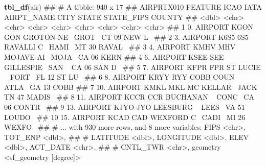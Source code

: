 \documentclass[11pt,ignorenonframetext,]{beamer}
\newenvironment{Shaded}{}{}
\newcommand{\KeywordTok}[1]{\textcolor[rgb]{0.00,0.44,0.13}{\textbf{#1}}}
\newcommand{\NormalTok}[1]{#1}
\let\oldShaded\Shaded
\let\endoldShaded\endShaded
\renewenvironment{Shaded}{\footnotesize\begin{spacing}{0.9}\oldShaded}{\endoldShaded\end{spacing}}
\let\oldverbatim\verbatim
\let\endoldverbatim\endverbatim
\newcommand{\scriptoutput}{
  \renewenvironment{Shaded}{\scriptsize\begin{spacing}{0.9}\oldShaded}{\endoldShaded\end{spacing}}
  \renewenvironment{verbatim}{\scriptsize\begin{spacing}{0.9}\oldverbatim}{\endoldverbatim\end{spacing}}
}
\begin{document}
\begin{frame}[fragile,t]{}
\protect\hypertarget{section-2}{}

\scriptoutput

\begin{Shaded}
\begin{Highlighting}[]
\KeywordTok{tbl_df}\NormalTok{(air)}
\NormalTok{## # A tibble: 940 x 17}
\NormalTok{##    AIRPRTX010 FEATURE ICAO  IATA  AIRPT_NAME CITY  STATE STATE_FIPS COUNTY}
\NormalTok{##         <dbl> <chr>   <chr> <chr> <chr>      <chr> <chr> <chr>      <chr> }
\NormalTok{##  1         0. AIRPORT KGON  GON   GROTON-NE~ GROT~ CT    09         NEW L~}
\NormalTok{##  2         3. AIRPORT K6S5  6S5   RAVALLI C~ HAMI~ MT    30         RAVAL~}
\NormalTok{##  3         4. AIRPORT KMHV  MHV   MOJAVE AI~ MOJA~ CA    06         KERN  }
\NormalTok{##  4         6. AIRPORT KSEE  SEE   GILLESPIE~ SAN ~ CA    06         SAN D~}
\NormalTok{##  5         7. AIRPORT KFPR  FPR   ST LUCIE ~ FORT~ FL    12         ST LU~}
\NormalTok{##  6         8. AIRPORT KRYY  RYY   COBB COUN~ ATLA~ GA    13         COBB  }
\NormalTok{##  7        10. AIRPORT KMKL  MKL   MC KELLAR~ JACK~ TN    47         MADIS~}
\NormalTok{##  8        11. AIRPORT KCCR  CCR   BUCHANAN ~ CONC~ CA    06         CONTR~}
\NormalTok{##  9        13. AIRPORT KJYO  JYO   LEESBURG ~ LEES~ VA    51         LOUDO~}
\NormalTok{## 10        15. AIRPORT KCAD  CAD   WEXFORD C~ CADI~ MI    26         WEXFO~}
\NormalTok{## # ... with 930 more rows, and 8 more variables: FIPS <chr>, TOT_ENP <dbl>,}
\NormalTok{## #   LATITUDE <dbl>, LONGITUDE <dbl>, ELEV <dbl>, ACT_DATE <chr>,}
\NormalTok{## #   CNTL_TWR <chr>, geometry <sf_geometry [degree]>}
\end{Highlighting}
\end{Shaded}

\end{frame}
\end{document}
